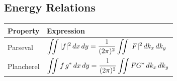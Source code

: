 \subsection{Energy Relations}

\begin{center}
\begin{tabular}{ll}
\toprule
Property & Expression\\
\midrule

Parseval &
$\displaystyle
\iint |f|^2\,dx\,dy
=
\frac{1}{(2\pi)^2}
\iint |F|^2\,dk_x\,dk_y
$

\\[0.5cm]

Plancherel &
$\displaystyle
\iint f\,g^{*}\,dx\,dy
=
\frac{1}{(2\pi)^2}
\iint FG^{*}\,dk_x\,dk_y
$

\\

\bottomrule
\end{tabular}
\end{center}